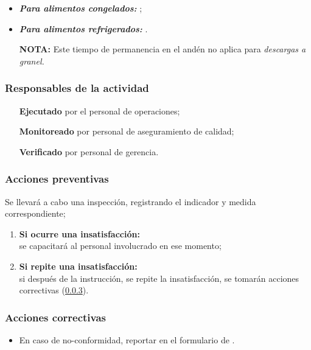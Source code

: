 

\begin{note}\label{TiempoDePermanencia-Anden}
	\begin{itemize}
		\item \emph{\textbf{Para alimentos congelados:}} \TiempoAndenCong;
		\item \emph{\textbf{Para alimentos refrigerados:}} \TiempoAndenRefri.
		\item[\textbf{NOTA:}] Este tiempo de permanencia en el andén no aplica para \emph{descargas a granel.}
	\end{itemize}
\end{note}

\subsubsection{Responsables de la actividad}
\begin{itemize}
	\item[\textbf{Ejecutado}] por el personal de operaciones;
	\item[\textbf{Monitoreado}] por personal de aseguramiento de calidad;
	\item[\textbf{Verificado}] por personal de gerencia.
\end{itemize}

\subsubsection{Acciones preventivas}
Se llevará a cabo una inspección, registrando el indicador y medida correspondiente;
\begin{enumerate}
	\item \textbf{Si ocurre una insatisfacción:}\\ se capacitará al personal involucrado en ese momento;
	\item \textbf{Si repite una insatisfacción:}\\ si después de la instrucción, se repite la insatisfacción, se tomarán acciones correctivas (\cref{sec:2.1:acc}).
\end{enumerate}

\subsubsection{Acciones correctivas}\label{sec:2.1:acc}
\begin{itemize}
	\item En caso de no-conformidad, reportar en el formulario de \RAC.
\end{itemize}

